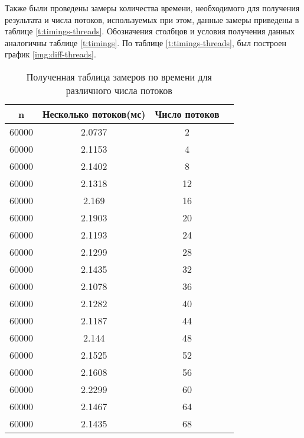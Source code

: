 Также были проведены замеры количества времени, необходимого для получения результата
и числа потоков, используемых при этом, данные замеры приведены в таблице \ref{t:timings-threads}.
Обозначения столбцов и условия получения данных аналогичны таблице \ref{t:timings}. По таблице  \ref{t:timings-threads}, был построен график \ref{img:diff-threads}.


\begin{table}[H]
	\centering
	\caption{Полученная таблица замеров по времени для различного числа потоков}
	\begin{tabular}{|c|c|c|c|}
		\hline
		n     & Несколько потоков(мс) & Число потоков \\ \hline
		60000 & 2.0737                            & 2             \\ \hline
		60000 & 2.1153                            & 4             \\ \hline
		60000 & 2.1402                            & 8             \\ \hline
		60000 & 2.1318                            & 12            \\ \hline
		60000 & 2.169                             & 16            \\ \hline
		60000 & 2.1903                            & 20            \\ \hline
		60000 & 2.1193                            & 24            \\ \hline
		60000 & 2.1299                            & 28            \\ \hline
		60000 & 2.1435                            & 32            \\ \hline
		60000 & 2.1078                            & 36            \\ \hline
		60000 & 2.1282                            & 40            \\ \hline
		60000 & 2.1187                            & 44            \\ \hline
		60000 & 2.144                             & 48            \\ \hline
		60000 & 2.1525                            & 52            \\ \hline
		60000 & 2.1608                            & 56            \\ \hline
		60000 & 2.2299                            & 60            \\ \hline
		60000 & 2.1467                            & 64            \\ \hline
		60000 & 2.1435                            & 68            \\ \hline

\end{tabular}
\end{table}
